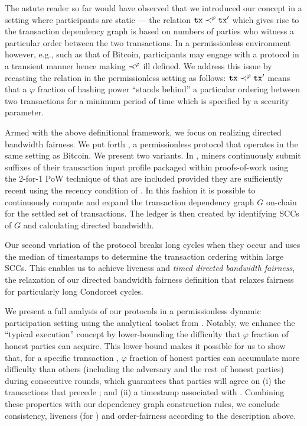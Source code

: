 The astute reader so far would have observed that we introduced our concept in a setting where participants are static --- the relation $\mathtt{tx} \prec^\varphi \mathtt{tx}'$  which gives rise to the transaction dependency graph is based on numbers of parties who witness a particular order between the two transactions.
%
In a permissionless environment however, e.g., such as that of Bitcoin, participants may engage with a protocol in a transient manner hence making $\prec^\varphi$ ill defined.
%
We address this issue by recasting the relation in the permissionless setting as follows:  $\mathtt{tx} \prec^\varphi \mathtt{tx}'$ means that a $\varphi$ fraction of hashing power ``stands behind'' a particular ordering between two transactions for a minimum period of time which is specified by a security parameter.

Armed with the above definitional framework, we focus on realizing directed bandwidth fairness.
%
We put forth \Taxis, a permissionless protocol that operates in the same setting as Bitcoin.
%
We present two variants.
%
In \TaxisWL, miners continuously submit suffixes of their transaction input profile packaged within proofs-of-work using the 2-for-1 PoW technique of \cite{C:GarKiaLeo17} that are included provided they are sufficiently recent using the recency condition of \cite{PODC:PasShi17}.
%
In this fashion it is possible to continuously compute and expand the transaction dependency graph $G$ on-chain for the settled set of transactions.
%
The ledger is then created by identifying SCCs of $G$ and calculating directed bandwidth.

Our second variation of the \Taxis protocol breaks long cycles when they occur and uses the median of timestamps to determine the transaction ordering within large SCCs.
%
This enables us to achieve liveness and \emph{timed directed bandwidth fairness}, the relaxation of our directed bandwidth fairness definition that relaxes fairness for particularly long Condorcet cycles.

We present a full analysis of our protocols in a permissionless dynamic participation setting using the analytical toolset from \cite{C:GarKiaLeo17,EPRINT:GarKiaLeo20}.
%
Notably, we enhance the ``typical execution'' concept by lower-bounding the difficulty that $\varphi$ fraction of honest parties can acquire.
%
This lower bound makes it possible for us to show that, for a specific transaction \tx, $\varphi$ fraction of honest parties can accumulate more difficulty than others (including the adversary and the rest of honest parties) during \PBWindowLen consecutive rounds, which guarantees that parties will agree on (i) the transactions that precede \tx; and (ii) a timestamp associated with \tx.
%
Combining these properties with our dependency graph construction rules, we conclude consistency, liveness (for \Taxis) and order-fairness according to the description above.

